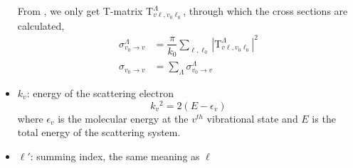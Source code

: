 \documentclass[aps,pra,groupedaddress,12pt,
               amsfonts,amssymb,
               preprint
    ]{revtex4}
\begin{document}
\begin{itemize}
  From , we only get T-matrix
  $\mathrm{T}_{v\ell,v_0\ell_0}^{\Lambda}$, through which the cross
  sections are calculated,
  \begin{subequations}
    \begin{align}
      \label{eq:ICS}
      \sigma_{v_0\rightarrow v}^{\Lambda} & =
      \dfrac{\pi}{k_0}\sum_{\ell,\ell_0}
      |\mathrm{T}_{v\ell,v_0\ell_0}^{\Lambda}|^2 \\
      \sigma_{v_0\rightarrow v} & = \sum_{\Lambda}\sigma_{v_0\rightarrow v}^{\Lambda}
    \end{align}
  \end{subequations}
\item $k_v$: energy of the scattering electron
  \begin{equation}
    \label{eq:5}
    k_v{}^2 = 2(E-\epsilon_v)
  \end{equation}
  where $\epsilon_v$ is the molecular energy at the $v^{th}$
  vibrational state and $E$ is the total energy of the scattering
  system.
\item $\ell'$: summing index, the same meaning as $\ell$


\end{itemize}
\end{document}
